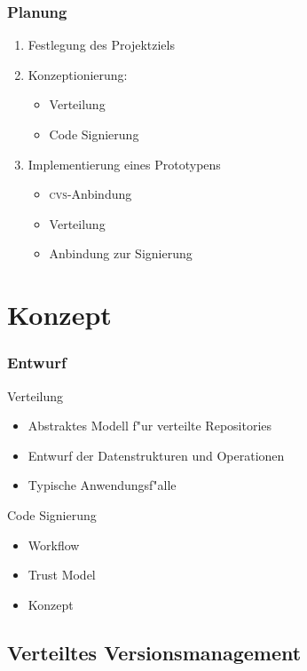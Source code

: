 \documentclass[german, presentation]{beamer}
\newcommand{\CVS}{\textsc{cvs}}
\newcommand{\HAKEN}{\ding{51}}
\begin{document}
\begin{frame}
  \frametitle{Planung}
  \begin{enumerate}
  \item Festlegung des Projektziels \only<2>{\HAKEN}
  \item Konzeptionierung:
    \begin{itemize}
    \item Verteilung \only<2>{\HAKEN}
    \item Code Signierung \only<2>{\HAKEN}
    \end{itemize}
  \item Implementierung eines Prototypens
    \begin{itemize}
    \item \CVS{}-Anbindung 
    \item Verteilung
    \item Anbindung zur Signierung
    \end{itemize}
  \end{enumerate}
\end{frame}

\section{Konzept}

\begin{frame}
  \frametitle{Entwurf}
  \begin{block}{Verteilung}
    \begin{itemize}
    \item Abstraktes Modell f"ur verteilte Repositories
    \item Entwurf der Datenstrukturen und Operationen
    \item Typische Anwendungsf"alle
    \end{itemize}
  \end{block}
  \begin{block}{Code Signierung}
    \begin{itemize}
    \item Workflow
    \item Trust Model
    \item Konzept
    \end{itemize}
  \end{block}
\end{frame}

\subsection{Verteiltes Versionsmanagement}
\newcommand{\STRUCT}[1]{\ensuremath{\mathnormal{#1}}}
\newcommand{\NORMAL}[1]{\ensuremath{\mbox{\textnormal{#1}}}}
\def\APPEND{:\mathrel\cdot}
\end{document}
